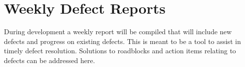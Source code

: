 \section{Weekly Defect Reports}
During development a weekly report will be compiled that will include new defects and progress on existing defects. This is meant to be a tool to assist in timely defect resolution. Solutions to roadblocks and action items relating to defects can be addressed here.

